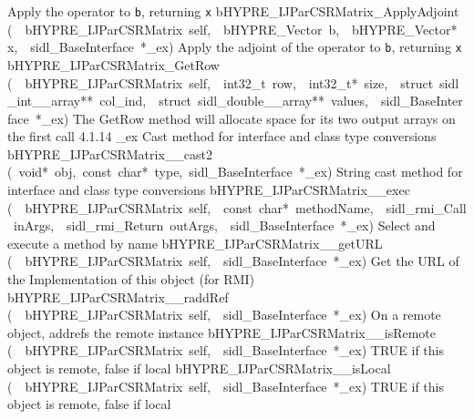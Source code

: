 \documentclass{article}
\begin{document}
\begin{cxxentry}
\begin{cxxentry}
\begin{cxxnames}
        {
Apply the operator to {\tt b}, returning {\tt x}}
        {}
\label{cxx.4.1.34}
        {bHYPRE\_IJParCSRMatrix\_ApplyAdjoint}
        {(\ \ bHYPRE\_IJParCSRMatrix\ self,\ \ bHYPRE\_Vector\ b,\ \ bHYPRE\_Vector*\ x,\ \ sidl\_BaseInterface\ *\_ex)}
        {
Apply the adjoint of the operator to {\tt b}, returning {\tt x}}
        {}
\label{cxx.4.1.35}
        {bHYPRE\_IJParCSRMatrix\_GetRow}
        {(\ \ bHYPRE\_IJParCSRMatrix\ self,\ \ int32\_t\ row,\ \ int32\_t*\ size,\ \ struct\ sidl\_int\_\_array**\ col\_ind,\ \ struct\ sidl\_double\_\_array**\ values,\ \ sidl\_BaseInterface\ *\_ex)}
        {
The GetRow method will allocate space for its two output
arrays on the first call}
        {4.1.14}
        {\_ex}
        {}
        {
Cast method for interface and class type conversions}
        {}
\label{cxx.4.1.36}
        {bHYPRE\_IJParCSRMatrix\_\_cast2}
        {(\ void*\ obj,\ const\ char*\ type,\ sidl\_BaseInterface\ *\_ex)}
        {
String cast method for interface and class type conversions}
        {}
\label{cxx.4.1.37}
        {bHYPRE\_IJParCSRMatrix\_\_exec}
        {(\ \ bHYPRE\_IJParCSRMatrix\ self,\ \ const\ char*\ methodName,\ \ sidl\_rmi\_Call\ inArgs,\ \ sidl\_rmi\_Return\ outArgs,\ \ sidl\_BaseInterface\ *\_ex)}
        {
Select and execute a method by name}
        {}
\label{cxx.4.1.38}
        {bHYPRE\_IJParCSRMatrix\_\_getURL}
        {(\ \ bHYPRE\_IJParCSRMatrix\ self,\ \ sidl\_BaseInterface\ *\_ex)}
        {
Get the URL of the Implementation of this object (for RMI)}
        {}
\label{cxx.4.1.39}
        {bHYPRE\_IJParCSRMatrix\_\_raddRef}
        {(\ \ bHYPRE\_IJParCSRMatrix\ self,\ \ sidl\_BaseInterface\ *\_ex)}
        {
On a remote object, addrefs the remote instance}
        {}
\label{cxx.4.1.40}
        {bHYPRE\_IJParCSRMatrix\_\_isRemote}
        {(\ \ bHYPRE\_IJParCSRMatrix\ self,\ \ sidl\_BaseInterface\ *\_ex)}
        {
TRUE if this object is remote, false if local}
        {}
\label{cxx.4.1.41}
        {bHYPRE\_IJParCSRMatrix\_\_isLocal}
        {(\ \ bHYPRE\_IJParCSRMatrix\ self,\ \ sidl\_BaseInterface\ *\_ex)}
        {
TRUE if this object is remote, false if local}
        {}
\label{cxx.4.1.42}

\end{cxxnames}
\end{cxxentry}
\end{cxxentry}
\end{document}

